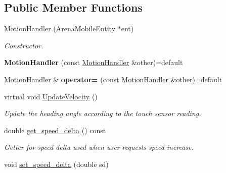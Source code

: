\subsection*{Public Member Functions}
\begin{DoxyCompactItemize}
\item 
\hyperlink{class_motion_handler_a48c0070bfda6acb8a7493eb7fe1200c4}{Motion\+Handler} (\hyperlink{class_arena_mobile_entity}{Arena\+Mobile\+Entity} $\ast$ent)\hypertarget{class_motion_handler_a48c0070bfda6acb8a7493eb7fe1200c4}{}\label{class_motion_handler_a48c0070bfda6acb8a7493eb7fe1200c4}

\begin{DoxyCompactList}\small\item\em Constructor. \end{DoxyCompactList}\item 
{\bfseries Motion\+Handler} (const \hyperlink{class_motion_handler}{Motion\+Handler} \&other)=default\hypertarget{class_motion_handler_a91dc98beab9d5ccce6b6c18ce32c0488}{}\label{class_motion_handler_a91dc98beab9d5ccce6b6c18ce32c0488}

\item 
\hyperlink{class_motion_handler}{Motion\+Handler} \& {\bfseries operator=} (const \hyperlink{class_motion_handler}{Motion\+Handler} \&other)=default\hypertarget{class_motion_handler_ad45188f2d9794fd2b257d586a7b522e6}{}\label{class_motion_handler_ad45188f2d9794fd2b257d586a7b522e6}

\item 
virtual void \hyperlink{class_motion_handler_ad9bfac3d0ec3cec1d607f41475886c3c}{Update\+Velocity} ()\hypertarget{class_motion_handler_ad9bfac3d0ec3cec1d607f41475886c3c}{}\label{class_motion_handler_ad9bfac3d0ec3cec1d607f41475886c3c}

\begin{DoxyCompactList}\small\item\em Update the heading angle according to the touch sensor reading. \end{DoxyCompactList}\item 
double \hyperlink{class_motion_handler_a7a9b503e3da267c7af25d58daff5f216}{get\+\_\+speed\+\_\+delta} () const \hypertarget{class_motion_handler_a7a9b503e3da267c7af25d58daff5f216}{}\label{class_motion_handler_a7a9b503e3da267c7af25d58daff5f216}

\begin{DoxyCompactList}\small\item\em Getter for speed delta used when user requests speed increase. \end{DoxyCompactList}\item 
void \hyperlink{class_motion_handler_a908b330346b3fe969684106bd5c7619d}{set\+\_\+speed\+\_\+delta} (double sd)\hypertarget{class_motion_handler_a908b330346b3fe969684106bd5c7619d}{}\label{class_motion_handler_a908b330346b3fe969684106bd5c7619d}


\end{DoxyCompactItemize}
